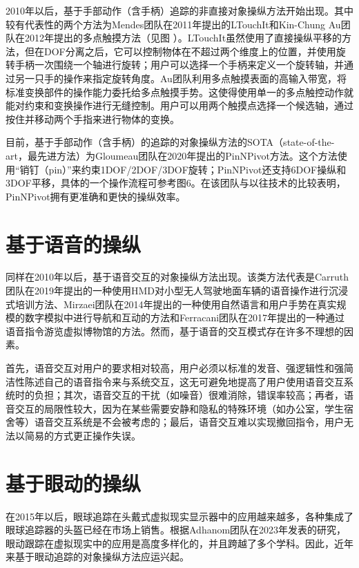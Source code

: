 2010年以后，基于手部动作（含手柄）追踪的非直接对象操纵方法开始出现。其中较有代表性的两个方法为Mendes团队在2011年提出的LTouchIt和Kin-Chung Au团队在2012年提出的多点触摸方法（见图 ）。LTouchIt虽然使用了直接操纵平移的方法，但在DOF分离之后，它可以控制物体在不超过两个维度上的位置，并使用旋转手柄一次围绕一个轴进行旋转；用户可以选择一个手柄来定义一个旋转轴，并通过另一只手的操作来指定旋转角度。Au团队利用多点触摸表面的高输入带宽，将标准变换部件的操作能力委托给多点触摸手势。这使得使用单一的多点触控动作就能对约束和变换操作进行无缝控制。用户可以用两个触摸点选择一个候选轴，通过按住并移动两个手指来进行物体的变换。

目前，基于手部动作（含手柄）的追踪的对象操纵方法的SOTA（state-of-the-art，最先进方法）为Gloumeau团队在2020年提出的PinNPivot方法。这个方法使用“销钉（pin）”来约束1DOF/2DOF/3DOF旋转；PinNPivot还支持6DOF操纵和3DOF平移，具体的一个操作流程可参考图6。在该团队与以往技术的比较表明，PinNPivot拥有更准确和更快的操纵效率。

\section{基于语音的操纵}

同样在2010年以后，基于语音交互的对象操纵方法出现。该类方法代表是Carruth团队在2019年提出的一种使用HMD对小型无人驾驶地面车辆的语音操作进行沉浸式培训方法、Mirzaei团队在2014年提出的一种使用自然语言和用户手势在真实规模的数字模拟中进行导航和互动的方法和Ferracani团队在2017年提出的一种通过语音指令游览虚拟博物馆的方法。然而，基于语音的交互模式存在许多不理想的因素。

首先，语音交互对用户的要求相对较高，用户必须以标准的发音、强逻辑性和强简洁性陈述自己的语音指令来与系统交互，这无可避免地提高了用户使用语音交互系统时的负担；其次，语音交互的干扰（如噪音）很难消除，错误率较高；再者，语音交互的局限性较大，因为在某些需要安静和隐私的特殊环境（如办公室，学生宿舍等）语音交互系统是不会被考虑的；最后，语音交互难以实现撤回指令，用户无法以简易的方式更正操作失误。

\section{基于眼动的操纵}

在2015年以后，眼球追踪在头戴式虚拟现实显示器中的应用越来越多，各种集成了眼球追踪器的头盔已经在市场上销售。根据Adhanom团队在2023年发表的研究，眼动跟踪在虚拟现实中的应用是高度多样化的，并且跨越了多个学科。因此，近年来基于眼动追踪的对象操纵方法应运兴起。

